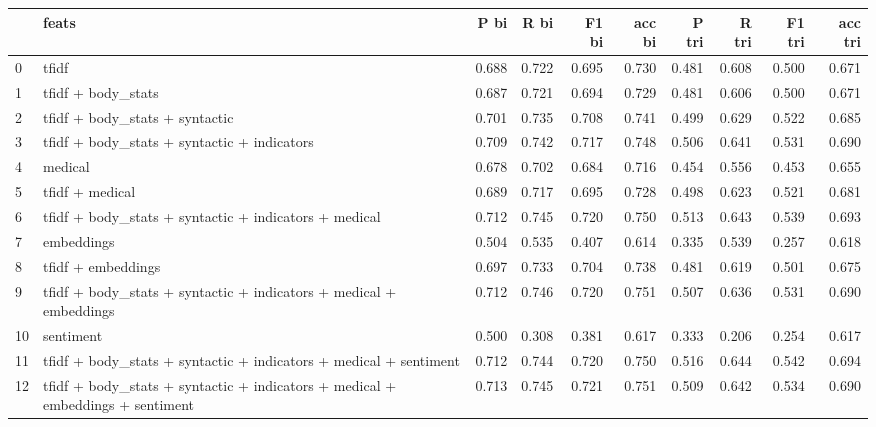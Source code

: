 \begin{tabular}{llrrrrrrrr}
\toprule
{} &                                                                           feats &   P bi &   R bi &  F1 bi &  acc bi &  P tri &  R tri &  F1 tri &  acc tri \\ \hline
\midrule
0  &                                                                           tfidf &  0.688 &  0.722 &  0.695 &   0.730 &  0.481 &  0.608 &   0.500 &    0.671 \\ \hline
1  &                                                              tfidf + body\_stats &  0.687 &  0.721 &  0.694 &   0.729 &  0.481 &  0.606 &   0.500 &    0.671 \\ \hline
2  &                                                  tfidf + body\_stats + syntactic &  0.701 &  0.735 &  0.708 &   0.741 &  0.499 &  0.629 &   0.522 &    0.685 \\ \hline
3  &                                     tfidf + body\_stats + syntactic + indicators &  0.709 &  0.742 &  0.717 &   0.748 &  0.506 &  0.641 &   0.531 &    0.690 \\ \hline
4  &                                                                         medical &  0.678 &  0.702 &  0.684 &   0.716 &  0.454 &  0.556 &   0.453 &    0.655 \\ \hline
5  &                                                                 tfidf + medical &  0.689 &  0.717 &  0.695 &   0.728 &  0.498 &  0.623 &   0.521 &    0.681 \\ \hline
6  &                           tfidf + body\_stats + syntactic + indicators + medical &  0.712 &  0.745 &  0.720 &   0.750 &  0.513 &  0.643 &   0.539 &    0.693 \\ \hline
7  &                                                                      embeddings &  0.504 &  0.535 &  0.407 &   0.614 &  0.335 &  0.539 &   0.257 &    0.618 \\ \hline
8  &                                                              tfidf + embeddings &  0.697 &  0.733 &  0.704 &   0.738 &  0.481 &  0.619 &   0.501 &    0.675 \\ \hline
9  &              tfidf + body\_stats + syntactic + indicators + medical + embeddings &  0.712 &  0.746 &  0.720 &   0.751 &  0.507 &  0.636 &   0.531 &    0.690 \\ \hline
10 &                                                                       sentiment &  0.500 &  0.308 &  0.381 &   0.617 &  0.333 &  0.206 &   0.254 &    0.617 \\ \hline
11 &               tfidf + body\_stats + syntactic + indicators + medical + sentiment &  0.712 &  0.744 &  0.720 &   0.750 &  0.516 &  0.644 &   0.542 &    0.694 \\ \hline
12 &  tfidf + body\_stats + syntactic + indicators + medical + embeddings + sentiment &  0.713 &  0.745 &  0.721 &   0.751 &  0.509 &  0.642 &   0.534 &    0.690 \\ \hline
\bottomrule
\end{tabular}
